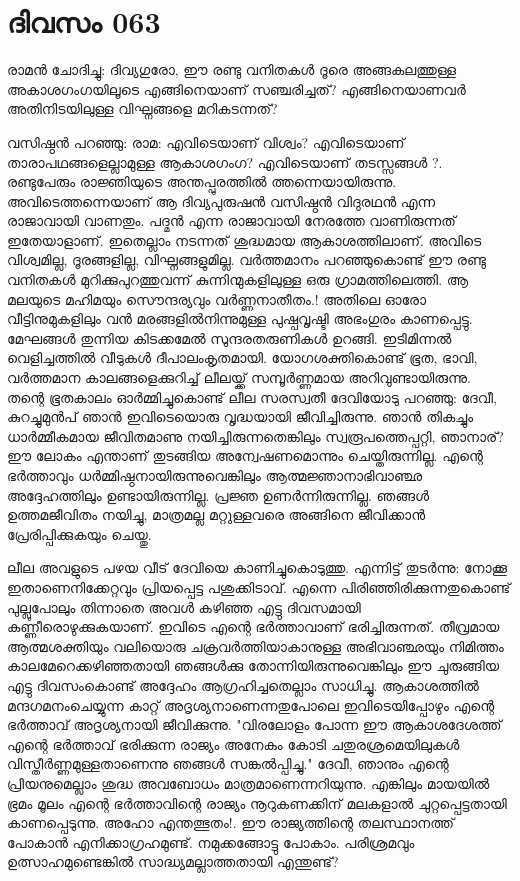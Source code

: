  
\section{ദിവസം 063}


രാമന്‍ ചോദിച്ചു: ദിവ്യഗുരോ, ഈ രണ്ടു വനിതകള്‍ ദൂരെ അങ്ങകലത്തുള്ള അകാശഗംഗയിലൂടെ എങ്ങിനെയാണ്‌ സഞ്ചരിച്ചത്‌? എങ്ങിനെയാണവര്‍ അതിനിടയിലുള്ള വിഘ്നങ്ങളെ മറികടന്നത്‌?

വസിഷ്ഠന്‍ പറഞ്ഞു: രാമ: എവിടെയാണ്‌ വിശ്വം? എവിടെയാണ്‌ താരാപഥങ്ങളെല്ലാമുള്ള ആകാശഗംഗ? എവിടെയാണ്‌ തടസ്സങ്ങള്‍ ?. രണ്ടുപേരും രാജ്ഞിയുടെ അന്തപ്പുരത്തില്‍ ത്തന്നെയായിരുന്നു. അവിടെത്തന്നെയാണ്‌ ആ ദിവ്യപുരുഷന്‍ വസിഷ്ഠന്‍ വിദുരഥന്‍ എന്ന രാജാവായി വാണതും. പദ്മന്‍ എന്ന രാജാവായി നേരത്തേ വാണിരുന്നത്‌ ഇതേയാളാണ്‌. ഇതെല്ലാം നടന്നത്‌ ശുദ്ധമായ ആകാശത്തിലാണ്‌. അവിടെ വിശ്വമില്ല, ദൂരങ്ങളില്ല, വിഘ്നങ്ങളുമില്ല. വര്‍ത്തമാനം പറഞ്ഞുകൊണ്ട്‌ ഈ രണ്ടു വനിതകള്‍ മുറിക്കുപുറത്തുവന്ന് കുന്നിന്മുകളിലുള്ള ഒരു ഗ്രാമത്തിലെത്തി. ആ മലയുടെ മഹിമയും സൌന്ദര്യവും വര്‍ണ്ണനാതീതം.! അതിലെ ഓരോ വീട്ടിനുമുകളിലും വന്‍ മരങ്ങളില്‍നിന്നുമുള്ള പുഷ്പവൃഷ്ടി അഭംഗുരം കാണപ്പെട്ടു. മേഘങ്ങള്‍ തുന്നിയ കിടക്കമേല്‍ സുന്ദരതരുണികള്‍ ഉറങ്ങി. ഇടിമിന്നല്‍ വെളിച്ചത്തില്‍ വീടുകള്‍ ദീപാലംകൃതമായി. യോഗശക്തികൊണ്ട്‌ ഭൂത, ഭാവി, വര്‍ത്തമാന കാലങ്ങളെക്കുറിച്ച്‌ ലീലയ്ക്ക്‌ സമ്പൂര്‍ണ്ണമായ അറിവുണ്ടായിരുന്നു. തന്റെ ഭൂതകാലം ഓര്‍മ്മിച്ചുകൊണ്ട്‌ ലീല സരസ്വതീ ദേവിയോടു പറഞ്ഞു: ദേവീ, കുറച്ചുമുന്‍പ്‌ ഞാന്‍ ഇവിടെയൊരു വൃദ്ധയായി ജീവിച്ചിരുന്നു. ഞാന്‍ തികച്ചും ധാര്‍മ്മീകമായ ജീവിതമാണു നയിച്ചിരുന്നതെങ്കിലും സ്വരൂപത്തെപ്പറ്റി, ഞാനാര്‌? ഈ ലോകം എന്താണ്‌ തുടങ്ങിയ അന്വേഷണമൊന്നും ചെയ്തിരുന്നില്ല. എന്റെ ഭര്‍ത്താവും ധര്‍മ്മിഷ്ഠനായിരുന്നുവെങ്കിലും ആത്മജ്ഞാനാഭിവാഞ്ഛ അദ്ദേഹത്തിലും ഉണ്ടായിരുന്നില്ല. പ്രജ്ഞ ഉണര്‍ന്നിരുന്നില്ല. ഞങ്ങള്‍ ഉത്തമജീവിതം നയിച്ചു, മാത്രമല്ല മറ്റുള്ളവരെ അങ്ങിനെ ജീവിക്കാന്‍ പ്രേരിപ്പിക്കുകയും ചെയ്തു. 

ലീല അവളുടെ പഴയ വീട്‌ ദേവിയെ കാണിച്ചുകൊടുത്തു. എന്നിട്ട്‌ തുടര്‍ന്നു: നോക്കൂ ഇതാണെനിക്കേറ്റവും പ്രിയപ്പെട്ട പശുക്കിടാവ്‌. എന്നെ പിരിഞ്ഞിരിക്കുന്നതുകൊണ്ട്‌ പുല്ലുപോലും തിന്നാതെ അവള്‍ കഴിഞ്ഞ എട്ടു ദിവസമായി കണ്ണീരൊഴുക്കുകയാണ്‌. ഇവിടെ എന്റെ ഭര്‍ത്താവാണ്‌ ഭരിച്ചിരുന്നത്‌. തീവ്രമായ ആത്മശക്തിയും വലിയൊരു ചക്രവര്‍ത്തിയാകാനുള്ള അഭിവാഞ്ഛയും നിമിത്തം കാലമേറെക്കഴിഞ്ഞതായി ഞങ്ങള്‍ക്കു തോന്നിയിരുന്നുവെങ്കിലും ഈ ചുരുങ്ങിയ എട്ടു ദിവസംകൊണ്ട്‌ അദ്ദേഹം ആഗ്രഹിച്ചതെല്ലാം സാധിച്ചു. ആകാശത്തില്‍ മന്ദഗമനംചെയ്യുന്ന കാറ്റ്‌ അദൃശ്യനാണെന്നതുപോലെ ഇവിടെയിപ്പോഴും എന്റെ ഭര്‍ത്താവ്‌ അദൃശ്യനായി ജീവിക്കുന്നു. "വിരലോളം പോന്ന ഈ ആകാശദേശത്ത്‌ എന്റെ ഭര്‍ത്താവ്‌ ഭരിക്കുന്ന രാജ്യം അനേകം കോടി ചതുരശ്രമെയിലുകള്‍ വിസ്തീര്‍ണ്ണമുള്ളതാണെന്നു ഞങ്ങള്‍ സങ്കല്‍പ്പിച്ചു." ദേവീ, ഞാനും എന്റെ പ്രിയനുമെല്ലാം ശുദ്ധ അവബോധം മാത്രമാണെന്നറിയുന്നു. എങ്കിലും മായയില്‍ ഭ്രമം മൂലം എന്റെ ഭര്‍ത്താവിന്റെ രാജ്യം നൂറുകണക്കിന്‌ മലകളാല്‍ ചുറ്റപ്പെട്ടതായി കാണപ്പെടുന്നു. അഹോ എന്തത്ഭുതം!. ഈ രാജ്യത്തിന്റെ തലസ്ഥാനത്ത്‌ പോകാന്‍ എനിക്കാഗ്രഹമുണ്ട്‌. നമുക്കങ്ങോട്ടു പോകാം. പരിശ്രമവും ഉത്സാഹമുണ്ടെങ്കില്‍ സാദ്ധ്യമല്ലാത്തതായി എന്തുണ്ട്‌?
